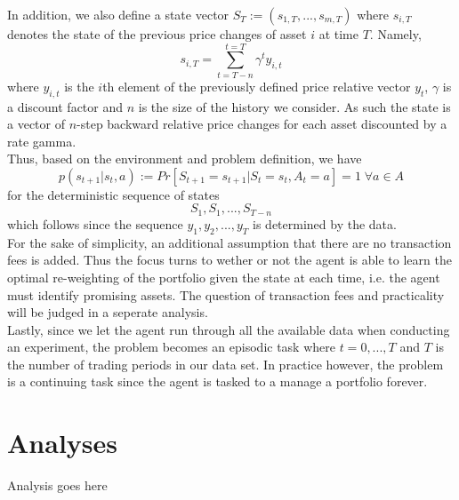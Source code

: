 \documentclass[a4paper,12pt]{article}
\begin{document}
In addition, we also define a state vector $S_T := (s_{1,T},...,s_{m,T})$ where $s_{i,T}$ denotes the state of the previous price changes of asset $i$ at time $T$. Namely,
$$s_{i,T} = \sum_{t=T-n}^{t=T} \gamma^t y_{i,t}$$ 
where $y_{i,t}$ is the $i$th element of the previously defined price relative vector $y_t$, $\gamma$ is a discount factor and $n$ is the size of the history we consider. As such the state is a vector of $n$-step backward relative price changes for each asset discounted by a rate gamma. \\

Thus, based on the environment and problem definition, we have 
$$p(s_{t+1} | s_t,a) := Pr[S_{t+1}=s_{t+1} | S_t=s_t,A_t=a] = 1 \; \forall a \in A$$
for the deterministic sequence of states
$$S_1,S_1,...,S_{T-n}$$
which follows since the sequence $y_1,y_2,...,y_T$ is determined by the data. \\

For the sake of simplicity, an additional assumption that there are no transaction fees is added. Thus the focus turns to wether or not the agent is able to learn the optimal re-weighting of the portfolio given the state at each time, i.e. the agent must identify promising assets. The question of transaction fees and practicality will be judged in a seperate analysis. \\

Lastly, since we let the agent run through all the available data when conducting an experiment, the problem becomes an episodic task where $t=0,...,T$ and $T$ is the number of trading periods in our data set. In practice however, the problem is a continuing task since the agent is tasked to a manage a portfolio forever.

\section{Analyses}
Analysis goes here
\end{document}
